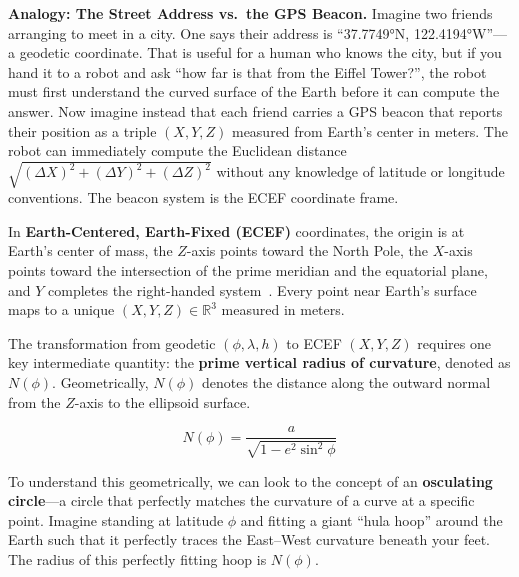 \documentclass{book}
\begin{document}
\textbf{Analogy: The Street Address vs.\ the GPS Beacon.}
Imagine two friends arranging to meet in a city.  One says their
address is ``37.7749°N, 122.4194°W''---a geodetic coordinate.  That
is useful for a human who knows the city, but if you hand it to a
robot and ask ``how far is that from the Eiffel Tower?'', the robot
must first understand the curved surface of the Earth before it can
compute the answer.  Now imagine instead that each friend carries a
GPS beacon that reports their position as a triple
$(X, Y, Z)$ measured from Earth's center in meters.  The robot can
immediately compute the Euclidean distance $\sqrt{(\Delta X)^2 +
(\Delta Y)^2 + (\Delta Z)^2}$ without any knowledge of latitude or
longitude conventions.  The beacon system is the ECEF coordinate frame.
 
In \textbf{Earth-Centered, Earth-Fixed (ECEF)} coordinates, the
origin is at Earth's center of mass, the $Z$-axis points toward the
North Pole, the $X$-axis points toward the intersection of the prime
meridian and the equatorial plane, and $Y$ completes the right-handed
system~\cite{nima2000wgs84}.  Every point near Earth's surface maps
to a unique $(X, Y, Z) \in \mathbb{R}^3$ measured in meters.
 
The transformation from geodetic $(\phi, \lambda, h)$ to ECEF $(X, Y, Z)$
requires one key intermediate quantity: the \textbf{prime vertical radius of
curvature}, denoted as $N(\phi)$. Geometrically, $N(\phi)$ denotes the distance along the outward normal from the $Z$-axis to the ellipsoid surface.
 
\begin{equation}
  N(\phi) = \frac{a}{\sqrt{1 - e^2 \sin^2\!\phi}}
  \label{eq:prime_vertical}
\end{equation}
 
To understand this geometrically, we can look to the concept of an
\textbf{osculating circle}---a circle that perfectly matches the curvature of a
curve at a specific point. Imagine standing at latitude $\phi$ and fitting a
giant ``hula hoop'' around the Earth such that it perfectly traces the
East--West curvature beneath your feet. The radius of this perfectly fitting
hoop is $N(\phi)$.
 
\end{document}
